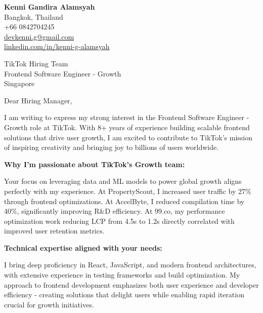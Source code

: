 \documentclass[12pt]{article}
\begin{document}
\begin{flushleft}
\textbf{\Large Kenni Gandira Alamsyah}\\
Bangkok, Thailand\\
+66 0842704245\\
\href{mailto:devkenni.g@gmail.com}{devkenni.g@gmail.com}\\
\href{https://www.linkedin.com/in/kenni-g-alamsyah}{linkedin.com/in/kenni-g-alamsyah}
\end{flushleft}

\vspace{1em}

\begin{flushleft}
TikTok Hiring Team\\
Frontend Software Engineer - Growth\\
Singapore
\end{flushleft}

\vspace{1em}

Dear Hiring Manager,

\vspace{0.5em}

I am writing to express my strong interest in the Frontend Software Engineer - Growth role at TikTok. With 8+ years of experience building scalable frontend solutions that drive user growth, I am excited to contribute to TikTok's mission of inspiring creativity and bringing joy to billions of users worldwide.

\vspace{0.5em}

\textbf{Why I'm passionate about TikTok's Growth team:}

\vspace{0.3em}

Your focus on leveraging data and ML models to power global growth aligns perfectly with my experience. At PropertyScout, I increased user traffic by 27\% through frontend optimizations. At AccelByte, I reduced compilation time by 40\%, significantly improving R\&D efficiency. At 99.co, my performance optimization work reducing LCP from 4.5s to 1.2s directly correlated with improved user retention metrics.

\vspace{0.5em}

\textbf{Technical expertise aligned with your needs:}

\vspace{0.3em}

I bring deep proficiency in React, JavaScript, and modern frontend architectures, with extensive experience in testing frameworks and build optimization. My approach to frontend development emphasizes both user experience and developer efficiency - creating solutions that delight users while enabling rapid iteration crucial for growth initiatives.
\end{document}
